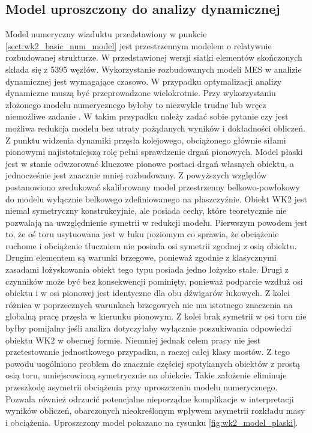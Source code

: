 \subsection{Model uproszczony do analizy dynamicznej}
Model numeryczny wiaduktu przedstawiony w punkcie \ref{sect:wk2_basic_num_model} jest przestrzennym modelem o relatywnie rozbudowanej strukturze. W przedstawionej wersji siatki elementów skończonych składa się z 5395 węzłów. Wykorzystanie rozbudowanych modeli MES w analizie dynamicznej jest wymagające czasowo. W przypadku optymalizacji analizy dynamiczne muszą być przeprowadzone wielokrotnie. Przy wykorzystaniu złożonego modelu numerycznego byłoby to niezwykle trudne lub wręcz niemożliwe zadanie \parencite{Zotowski2017c}. W takim przypadku należy zadać sobie pytanie czy jest możliwa redukcja modelu bez utraty pożądanych wyników i dokładności obliczeń. Z punktu widzenia dynamiki przęsła kolejowego, obciążonego głównie siłami pionowymi najistotniejszą rolę pełni sprawdzenie drgań pionowych. Model płaski jest w stanie odwzorować kluczowe pionowe postaci drgań własnych obiektu, a jednocześnie jest znacznie mniej rozbudowany. Z powyższych względów postanowiono zredukować skalibrowany model przestrzenny belkowo-powłokowy do modelu wyłącznie belkowego zdefiniowanego na płaszczyźnie. Obiekt WK2 jest niemal symetryczny konstrukcyjnie, ale posiada cechy, które teoretycznie nie pozwalają na uwzględnienie symetrii w redukcji modelu. Pierwszym powodem jest to, że oś toru usytuowana jest w łuku poziomym co sprawia, że obciążenie ruchome i obciążenie tłuczniem nie posiada osi symetrii zgodnej z osią obiektu. Drugim elementem są warunki brzegowe, ponieważ zgodnie z klasycznymi zasadami łożyskowania obiekt tego typu posiada jedno łożysko stałe. Drugi z czynników może być bez konsekwencji pominięty, ponieważ podparcie wzdłuż osi obiektu i w osi pionowej jest identyczne dla obu dźwigarów łukowych. Z kolei różnica w poprzecznych warunkach brzegowych nie ma istotnego znaczenia na globalną pracę przęsła w kierunku pionowym. Z kolei brak symetrii w osi toru nie byłby pomijalny jeśli analiza dotyczyłaby wyłącznie poszukiwania odpowiedzi obiektu WK2 w obecnej formie. Niemniej jednak celem pracy nie jest przetestowanie jednostkowego przypadku, a raczej całej klasy mostów. Z tego powodu uogólniono problem do znacznie częściej spotykanych obiektów z prostą osią toru, umiejscowioną symetrycznie na obiekcie. Takie założenie eliminuje przeszkodę asymetrii obciążenia przy uproszczeniu modelu numerycznego. Pozwala również odrzucić potencjalne nieporządne komplikacje w interpretacji wyników obliczeń, obarczonych nieokreślonym wpływem asymetrii rozkładu masy i obciążenia.
Uproszczony model pokazano na rysunku \ref{fig:wk2_model_plaski}.


